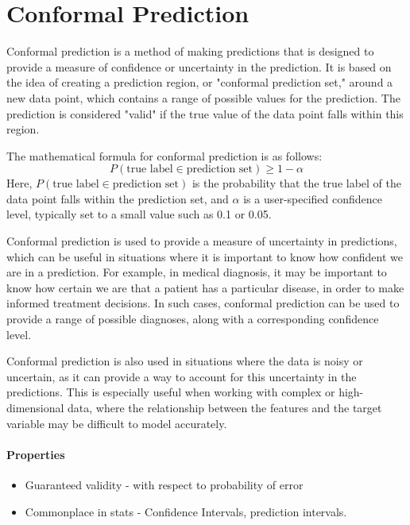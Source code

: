 \documentclass{article}
\theoremstyle{mytheoremstyle}
\theoremstyle{mytheoremstyle}
\theoremstyle{myproblemstyle}
\begin{document}
\section{Conformal Prediction}
\begin{definition}
	Conformal prediction is a method of making predictions that is designed to provide a measure of confidence or uncertainty in the prediction. It is based on the idea of creating a prediction region, or "conformal prediction set," around a new data point, which contains a range of possible values for the prediction. The prediction is considered "valid" if the true value of the data point falls within this region.

	The mathematical formula for conformal prediction is as follows:
	\begin{displaymath}
		P(\text{true label} \in \text{prediction set}) \geq 1 - \alpha

	\end{displaymath}
	Here, $P(\text{true label} \in \text{prediction set})$ is the probability that the true label of the data point falls within the prediction set, and $\alpha$ is a user-specified confidence level, typically set to a small value such as 0.1 or 0.05.

	Conformal prediction is used to provide a measure of uncertainty in predictions, which can be useful in situations where it is important to know how confident we are in a prediction. For example, in medical diagnosis, it may be important to know how certain we are that a patient has a particular disease, in order to make informed treatment decisions. In such cases, conformal prediction can be used to provide a range of possible diagnoses, along with a corresponding confidence level.

	Conformal prediction is also used in situations where the data is noisy or uncertain, as it can provide a way to account for this uncertainty in the predictions. This is especially useful when working with complex or high-dimensional data, where the relationship between the features and the target variable may be difficult to model accurately.
\end{definition}
\paragraph{Properties}
\begin{itemize}
	\item Guaranteed validity - with respect to probability of error
	\item Commonplace in stats - Confidence Intervals, prediction intervals.
\end{itemize}
\end{document}
